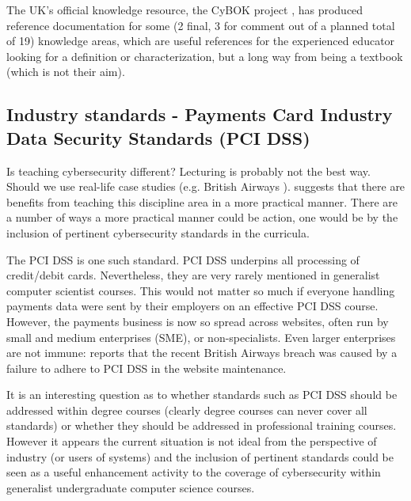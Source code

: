 \documentclass[conference]{IEEEtran}
\begin{document}
The UK's official knowledge resource, the CyBOK project \cite{Bristol2019a}, has produced reference documentation for some (2 final, 3 for comment out of a planned total of 19) knowledge areas, which are useful references for the experienced educator looking for a definition or characterization, but a long way from being a textbook (which is not their aim).






\subsection{Industry standards - Payments Card Industry Data Security Standards (PCI DSS)}\label{sec:PCIDSS}
Is teaching cybersecurity different? Lecturing is probably not the best way. Should we use real-life case studies (e.g. British Airways \cite{Barth2018a}). \cite{Weiss:2013:THC:2527148.2527180} suggests that there are benefits from teaching this discipline area in a more practical manner.  There are a number of ways a more practical manner could be action, one would be by the inclusion of pertinent cybersecurity standards in the curricula.

The PCI DSS \cite{PCI2018b} is one such standard. PCI DSS underpins all processing of credit/debit cards. Nevertheless, they are very rarely mentioned in generalist computer scientist courses. This would not matter so much if everyone handling payments data were sent by their employers on an effective PCI DSS course. However, the payments business is now so spread across websites, often run by small and medium enterprises (SME), or non-specialists.  Even larger enterprises are not immune: \cite{Barth2018a} reports that the recent British Airways breach was caused by a failure to adhere to PCI DSS in the website maintenance. 

It is an interesting question as to whether standards such as PCI DSS should be addressed within degree courses (clearly degree courses can never cover all standards) or whether they should be addressed in professional training courses. However it appears the current situation is not ideal from the perspective of industry (or users of systems) and the inclusion of pertinent standards could be seen as a useful enhancement activity to the coverage of cybersecurity within generalist undergraduate computer science courses.
\end{document}

